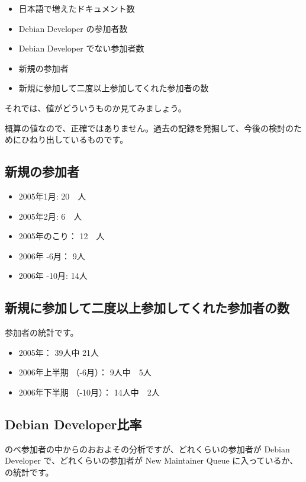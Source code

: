 \documentclass[mingoth,a4paper]{jsarticle}
\begin{document}
\begin{itemize}
 \item 日本語で増えたドキュメント数
 \item Debian Developer の参加者数
 \item Debian Developer でない参加者数
 \item 新規の参加者
 \item 新規に参加して二度以上参加してくれた参加者の数
\end{itemize}

それでは、値がどういうものか見てみましょう。

概算の値なので、正確ではありません。過去の記録を発掘して、今後の検討のた
めにひねり出しているものです。

\subsection{新規の参加者}

\begin{itemize}
 \item 2005年1月: 20　人
 \item 2005年2月: 6　人
 \item 2005年のこり： 12　人
 \item 2006年 -6月： 9人
 \item 2006年 -10月: 14人
\end{itemize}

\subsection{新規に参加して二度以上参加してくれた参加者の数}

参加者の統計です。

\begin{itemize}
 \item 2005年： 39人中 21人
 \item 2006年上半期 （-6月）： 9人中　5人
 \item 2006年下半期 （-10月）： 14人中　2人
\end{itemize}

\subsection{Debian Developer比率}

のべ参加者の中からのおおよその分析ですが、どれくらいの参加者が Debian
Developer で、どれくらいの参加者が New Maintainer Queue に入っているか、
の統計です。
\end{document}

